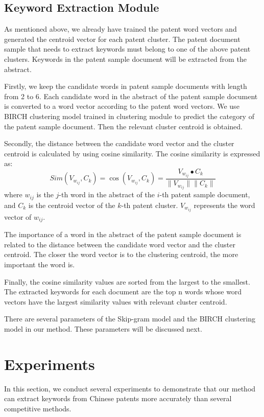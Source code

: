 \documentclass[conference]{IEEEtran}
\begin{document}
	\subsection{Keyword Extraction Module}
	As mentioned above, we already have trained the patent word vectors and generated the centroid vector for each patent cluster. The patent document sample that needs to extract keywords must belong to one of the above patent clusters. Keywords in the patent sample document will be extracted from the abstract.
	
	Firstly, we keep the candidate words in patent sample documents with length from 2 to 6. Each candidate word in the abstract of the patent sample document is converted to a word vector according to the patent word vectors. We use BIRCH clustering model trained in clustering module to predict the category of the patent sample document. Then the relevant cluster centroid is obtained.
	
	Secondly, the distance between the candidate word vector and the cluster centroid is calculated by using cosine similarity. The cosine similarity is expressed as:
	\begin{equation}
	Sim(V_{w_{ij}},C_k)=\cos{(V_{w_{ij}},C_k)}=\frac{V_{w_{ij}}\bullet C_k}{\|V_{w_{ij}}\|\|C_k\|}\label{eq3}
	\end{equation}
	where $w_{ij}$ is the $j$-th word in the abstract of the $i$-th patent sample document, and $C_k$ is the centroid vector of the $k$-th patent cluster. $V_{w_{ij}}$ represents the word vector of $w_{ij}$.
	
	The importance of a word in the abstract of the patent sample document is related to the distance between the candidate word vector and the cluster centroid. The closer the word vector is to the clustering centroid, the more important the word is.
	
	Finally, the cosine similarity values are sorted from the largest to the smallest. The extracted keywords for each document are the top n words whose word vectors have the largest similarity values with relevant cluster centroid.
	
	There are several parameters of the Skip-gram model and the BIRCH clustering model in our method. These parameters will be discussed next.
	
	\section{Experiments}
	In this section, we conduct several experiments to demonstrate that our method can extract keywords from Chinese patents more accurately than several competitive methods. 
	
\end{document}

